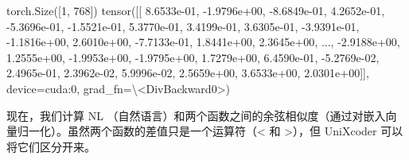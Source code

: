 \documentclass[
]{article}
\newenvironment{Shaded}{}{}
\newcommand{\DecValTok}[1]{\textcolor[rgb]{0.25,0.63,0.44}{#1}}
\newcommand{\FloatTok}[1]{\textcolor[rgb]{0.25,0.63,0.44}{#1}}
\newcommand{\NormalTok}[1]{#1}
\newcommand{\OperatorTok}[1]{\textcolor[rgb]{0.40,0.40,0.40}{#1}}
\newcommand{\StringTok}[1]{\textcolor[rgb]{0.25,0.44,0.63}{#1}}
\begin{document}
\begin{Shaded}
\begin{Highlighting}[]
    \NormalTok{torch.Size([}\DecValTok{1}\NormalTok{, }\DecValTok{768}\NormalTok{])}
    \NormalTok{tensor([[ }\FloatTok{8.6533e{-}01}\NormalTok{, }\OperatorTok{{-}}\FloatTok{1.9796e+00}\NormalTok{, }\OperatorTok{{-}}\FloatTok{8.6849e{-}01}\NormalTok{,  }\FloatTok{4.2652e{-}01}\NormalTok{, }\OperatorTok{{-}}\FloatTok{5.3696e{-}01}\NormalTok{,}
    \OperatorTok{{-}}\FloatTok{1.5521e{-}01}\NormalTok{,  }\FloatTok{5.3770e{-}01}\NormalTok{,  }\FloatTok{3.4199e{-}01}\NormalTok{,  }\FloatTok{3.6305e{-}01}\NormalTok{, }\OperatorTok{{-}}\FloatTok{3.9391e{-}01}\NormalTok{,}
    \OperatorTok{{-}}\FloatTok{1.1816e+00}\NormalTok{,  }\FloatTok{2.6010e+00}\NormalTok{, }\OperatorTok{{-}}\FloatTok{7.7133e{-}01}\NormalTok{,  }\FloatTok{1.8441e+00}\NormalTok{,  }\FloatTok{2.3645e+00}\NormalTok{,}
    \NormalTok{				 ...,}
    \OperatorTok{{-}}\FloatTok{2.9188e+00}\NormalTok{,  }\FloatTok{1.2555e+00}\NormalTok{, }\OperatorTok{{-}}\FloatTok{1.9953e+00}\NormalTok{, }\OperatorTok{{-}}\FloatTok{1.9795e+00}\NormalTok{,  }\FloatTok{1.7279e+00}\NormalTok{,}
    \FloatTok{6.4590e{-}01}\NormalTok{, }\OperatorTok{{-}}\FloatTok{5.2769e{-}02}\NormalTok{,  }\FloatTok{2.4965e{-}01}\NormalTok{,  }\FloatTok{2.3962e{-}02}\NormalTok{,  }\FloatTok{5.9996e{-}02}\NormalTok{,}
    \FloatTok{2.5659e+00}\NormalTok{,  }\FloatTok{3.6533e+00}\NormalTok{,  }\FloatTok{2.0301e+00}\NormalTok{]], device}\OperatorTok{=}\StringTok{\textquotesingle{}cuda:0\textquotesingle{}}\NormalTok{,}
    \NormalTok{       grad\_fn}\OperatorTok{=}\NormalTok{\textbackslash{}}\OperatorTok{\textless{}}\NormalTok{DivBackward0}\OperatorTok{\textgreater{}}\NormalTok{)}
  \end{Highlighting}
\end{Shaded}

现在，我们计算 NL
（自然语言）和两个函数之间的余弦相似度（通过对嵌入向量归一化）。虽然两个函数的差值只是一个运算符（\textless{}
和 \textgreater），但 UniXcoder 可以将它们区分开来。
\end{document}

